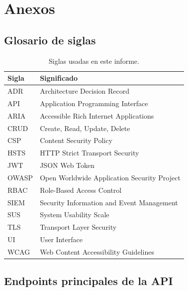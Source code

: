 \chapter{Anexos}
\label{cap:anexos}

\section{Glosario de siglas}

\begin{table}[H]
  \centering
  \small
  \begin{tabular}{@{}ll@{}}
    \toprule
    Sigla & Significado \\
    \midrule
    ADR & Architecture Decision Record \\
    API & Application Programming Interface \\
    ARIA & Accessible Rich Internet Applications \\
    CRUD & Create, Read, Update, Delete \\
    CSP & Content Security Policy \\
    HSTS & HTTP Strict Transport Security \\
    JWT & JSON Web Token \\
    OWASP & Open Worldwide Application Security Project \\
    RBAC & Role-Based Access Control \\
    SIEM & Security Information and Event Management \\
    SUS & System Usability Scale \\
    TLS & Transport Layer Security \\
    UI & User Interface \\
    WCAG & Web Content Accessibility Guidelines \\
    \bottomrule
  \end{tabular}
  \caption{Siglas usadas en este informe.}
  \label{tab:glosario}
\end{table}

\section{Endpoints principales de la API}

